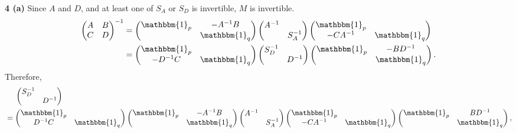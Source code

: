 \documentclass{article}
\makeatletter
\newcommand*{\shifttext}[1]{%
  \settowidth{\@tempdima}{#1}%
  \hspace{-\@tempdima}#1%
}
\newcommand{\plabel}[1]{%
\shifttext{\textbf{#1}\quad}%
}
\newcommand{\prule}{%
\begin{center}%
\hdashrule[0.5ex]{.99\linewidth}{1pt}{1pt 2.5pt}%
\end{center}%
}
\makeatother
\begin{document}
\prule
\plabel{4 (a)}%
Since $A$ and $D$, and at least one of $S_A$ or $S_D$ is invertible, $M$ is invertible.
\begin{align*}
    \begin{pmatrix}
        A & B \\
        C & D
    \end{pmatrix}^{-1} &= \begin{pmatrix}
        \mathbbm{1}_p & -A^{-1}B \\ & \mathbbm{1}_q
    \end{pmatrix} \begin{pmatrix}
        A^{-1} & \\ & S_A^{-1}
    \end{pmatrix} \begin{pmatrix}
        \mathbbm{1}_p & \\ -CA^{-1} & \mathbbm{1}_q
    \end{pmatrix} \\
    &= \begin{pmatrix}
        \mathbbm{1}_p & \\ -D^{-1}C & \mathbbm{1}_q
    \end{pmatrix} \begin{pmatrix}
        S^{-1}_D & \\ & D^{-1}
    \end{pmatrix} \begin{pmatrix}
        \mathbbm{1}_p & -BD^{-1} \\ & \mathbbm{1}_q
    \end{pmatrix}.
\end{align*}
Therefore,
\begin{align*}
    &{\phantom{{}={}}} \begin{pmatrix}
        S^{-1}_D & \\ & D^{-1}
    \end{pmatrix} \\
    &= \begin{pmatrix}
        \mathbbm{1}_p & \\ D^{-1}C & \mathbbm{1}_q
    \end{pmatrix} \begin{pmatrix}
        \mathbbm{1}_p & -A^{-1}B \\ & \mathbbm{1}_q
    \end{pmatrix} \begin{pmatrix}
        A^{-1} & \\ & S_A^{-1}
    \end{pmatrix} \begin{pmatrix}
        \mathbbm{1}_p & \\ -CA^{-1} & \mathbbm{1}_q
    \end{pmatrix} \begin{pmatrix}
        \mathbbm{1}_p & BD^{-1} \\ & \mathbbm{1}_q
    \end{pmatrix},
\end{align*}
\end{document}
